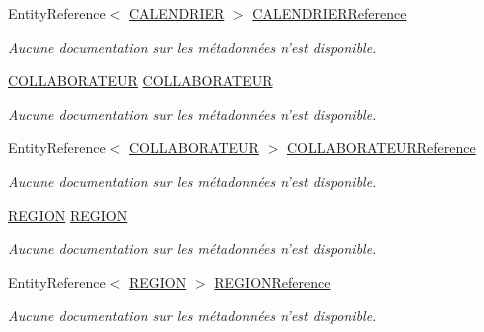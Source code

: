 \begin{DoxyCompactItemize}
Entity\-Reference$<$ \hyperlink{class_model_1_1_c_a_l_e_n_d_r_i_e_r}{C\-A\-L\-E\-N\-D\-R\-I\-E\-R} $>$ \hyperlink{class_model_1_1_g_e_r_e_a480b3df645ec158a0f1072ed6863e5e7}{C\-A\-L\-E\-N\-D\-R\-I\-E\-R\-Reference}
\begin{DoxyCompactList}\small\item\em Aucune documentation sur les métadonnées n'est disponible. \end{DoxyCompactList}\item 
\hyperlink{class_model_1_1_c_o_l_l_a_b_o_r_a_t_e_u_r}{C\-O\-L\-L\-A\-B\-O\-R\-A\-T\-E\-U\-R} \hyperlink{class_model_1_1_g_e_r_e_a8a670e1a6e5780b22b61677e850fa913}{C\-O\-L\-L\-A\-B\-O\-R\-A\-T\-E\-U\-R}
\begin{DoxyCompactList}\small\item\em Aucune documentation sur les métadonnées n'est disponible. \end{DoxyCompactList}\item 
Entity\-Reference$<$ \hyperlink{class_model_1_1_c_o_l_l_a_b_o_r_a_t_e_u_r}{C\-O\-L\-L\-A\-B\-O\-R\-A\-T\-E\-U\-R} $>$ \hyperlink{class_model_1_1_g_e_r_e_a295a48fabbabb795d933558e7918a334}{C\-O\-L\-L\-A\-B\-O\-R\-A\-T\-E\-U\-R\-Reference}
\begin{DoxyCompactList}\small\item\em Aucune documentation sur les métadonnées n'est disponible. \end{DoxyCompactList}\item 
\hyperlink{class_model_1_1_r_e_g_i_o_n}{R\-E\-G\-I\-O\-N} \hyperlink{class_model_1_1_g_e_r_e_a1fa1fc68ea779f030b9a471e22ce290a}{R\-E\-G\-I\-O\-N}
\begin{DoxyCompactList}\small\item\em Aucune documentation sur les métadonnées n'est disponible. \end{DoxyCompactList}\item 
Entity\-Reference$<$ \hyperlink{class_model_1_1_r_e_g_i_o_n}{R\-E\-G\-I\-O\-N} $>$ \hyperlink{class_model_1_1_g_e_r_e_a0f56d7771d836653c33cf5072e586b79}{R\-E\-G\-I\-O\-N\-Reference}
\begin{DoxyCompactList}\small\item\em Aucune documentation sur les métadonnées n'est disponible. \end{DoxyCompactList}\end{DoxyCompactItemize}


